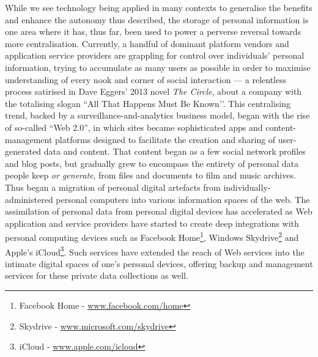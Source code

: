 \documentclass[graybox]{svmult}
\begin{document}
While we see technology being applied in many contexts to generalise the benefits and enhance the autonomy thus described, the storage of personal information is one area where it has, thus far, been used to power a perverse reversal towards more centralisation. Currently, a handful of dominant platform vendors and application service providers are grappling for control over individuals' personal information, trying to accumulate as many users as possible in order to maximise understanding of every nook and corner of social interaction --- a relentless process satirised in Dave Eggers’ 2013 novel {\em The Circle}, about a company with the totalising slogan ``All That Happens Must Be Known’’. This centralising trend, backed by a surveillance-and-analytics business model, began with the rise of so-called ``Web 2.0'', in which sites became sophisticated apps and content-management platforms designed to facilitate the creation and sharing of user-generated data and content. That content began as a few social network profiles and blog posts, but gradually grew to encompass the entirety of personal data people keep {\em or generate}, from files and documents to film and music archives. Thus began a migration of personal digital artefacts from individually-administered personal computers into various information spaces of the web.  The assimilation of personal data from personal digital devices has accelerated as Web application and service providers have started to create deep integrations with personal computing devices such as Facebook Home\footnote{Facebook Home - \url{www.facebook.com/home}}, Windows Skydrive\footnote{Skydrive - \url{www.microsoft.com/skydrive}} and Apple's iCloud\footnote{iCloud - \url{www.apple.com/icloud}}. Such services have extended the reach of Web services into the intimate digital spaces of one's personal devices, offering backup and management services for these private data collections as well.
\end{document}
